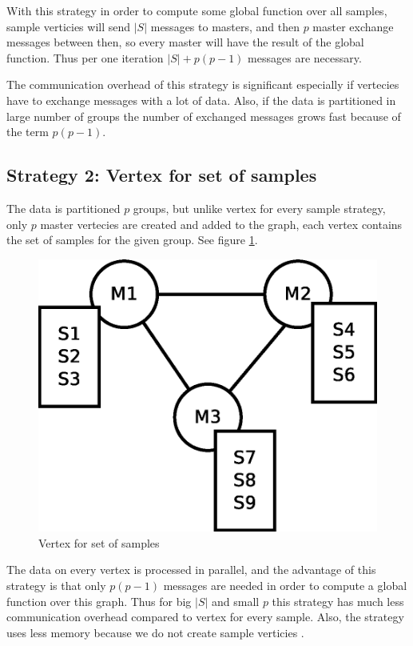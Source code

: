 \documentclass{report}
\begin{document}
With this strategy in order to compute some global function over all samples, sample verticies will send $|S|$ messages to masters, and then $p$  master exchange messages between then, so every master will have the result of the global function. Thus per one iteration $|S| + p(p-1)$ messages are necessary.

The communication overhead of this strategy is significant especially if vertecies have to exchange messages with a lot of data. Also, if the data is partitioned in large number of groups the number of exchanged messages grows fast because of the term $p(p-1)$.

\subsection{Strategy 2: Vertex for set of samples}

The data is partitioned $p$ groups, but unlike vertex for every sample strategy, only $p$ master vertecies are created and added to the graph, each vertex contains the set of samples for the given group. See figure \ref{fig:vss:graph2}.

\begin{figure}[!htb]
  \centering
  \includegraphics*[scale=0.45]{graph2.eps}
  \caption{Vertex for set of samples}
  \label{fig:vss:graph2}
\end{figure}

The data on every vertex is processed in parallel, and the advantage of this strategy is that only $p(p-1)$ messages are needed in order to compute a global function over this graph. Thus for big $|S|$ and small $p$ this strategy has much less communication overhead compared to vertex for every sample. Also, the strategy uses less memory because we do not create sample verticies .
\end{document}

